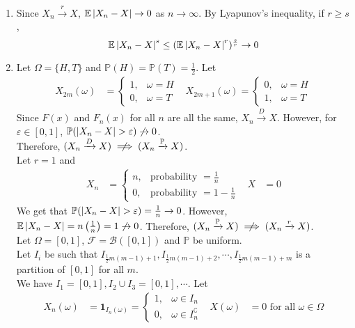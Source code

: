 \documentclass{huhtakm-template-book}
\newcommand{\prob}{\mathbb{P}}
\newcommand{\expect}{\mathbb{E}}
\begin{document}
\begin{proofing}
\begin{enumerate}
		\item Since $X_{n}\xrightarrow{r}X$, $\expect\abs{X_{n}-X}\to 0$ as $n\to\infty$. By Lyapunov's inequality, if $r\geq s$,
		\begin{equation*}
			\expect\abs{X_{n}-X}^{s}\leq(\expect\abs{X_{n}-X}^{r})^{\frac{s}{r}}\to 0
		\end{equation*}
		\item Let $\Omega=\{H,T\}$ and $\prob(H)=\prob(T)=\frac{1}{2}$. Let
		\begin{align*}
			X_{2m}(\omega)&=\begin{cases}
				1, &\omega=H\\
				0, &\omega=T
			\end{cases} & X_{2m+1}(\omega)=\begin{cases}
				0, &\omega=H\\
				1, &\omega=T
			\end{cases}
		\end{align*}
		Since $F(x)$ and $F_{n}(x)$ for all $n$ are all the same, $X_{n}\xrightarrow{D}X$. However, for $\varepsilon\in[0,1]$, $\prob(\abs{X_{n}-X}>\varepsilon)\not\to 0$.\\
		Therefore, $(X_{n}\xrightarrow{D}X)\centernot\implies(X_{n}\xrightarrow{\prob}X)$.\\
		Let $r=1$ and
		\begin{align*}
			X_{n}&=\begin{cases}
				n, &\text{probability }=\frac{1}{n}\\
				0, &\text{probability }=1-\frac{1}{n}
			\end{cases} & X&=0
		\end{align*}
		We get that $\prob(\abs{X_{n}-X}>\varepsilon)=\frac{1}{n}\to 0$. However, $\expect\abs{X_{n}-X}=n\left(\frac{1}{n}\right)=1\not\to 0$. Therefore, $(X_{n}\xrightarrow{\prob}X)\centernot\implies(X_{n}\xrightarrow{r}X)$.\\
		Let $\Omega=[0,1]$, $\mathcal{F}=\mathcal{B}([0,1])$ and $\prob$ be uniform.\\
		Let $I_{i}$ be such that $I_{\frac{1}{2}m(m-1)+1}, I_{\frac{1}{2}m(m-1)+2}, \cdots, I_{\frac{1}{2}m(m-1)+m}$ is a partition of $[0,1]$ for all $m$.\\
		We have $I_{1}=[0,1], I_{2}\cup I_{3}=[0,1],\cdots$. Let
		\begin{align*}
			X_{n}(\omega)&=\mathbf{1}_{I_{n}(\omega)}=\begin{cases}
				1, &\omega\in I_{n}\\
				0, &\omega\in I_{n}^{\complement}
			\end{cases} & X(\omega)&=0\text{ for all }\omega\in\Omega

\end{align*}
\end{enumerate}
\end{proofing}
\end{document}
